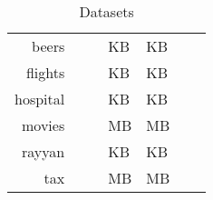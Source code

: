 \begin{table}[!t]
\caption{\label{tab:datasets_table}Datasets}
\centering
\begin{tabular}{r|K|K|K|K|H|K}
\toprule
 &  &  &   &   &  & \\
\midrule
beers    &    &  &   \textsc{KB} &   \textsc{KB} &   &  \\
flights  &    &   &   \textsc{KB} &   \textsc{KB} &   &  \\
hospital &    &  &   \textsc{KB} &   \textsc{KB} &  &  \\
movies   &    &  &  \textsc{MB} &  \textsc{MB} &  &  \\
rayyan   &    &  &   \textsc{KB} &   \textsc{KB} &   &  \\
tax      &  &  &  \textsc{MB} &  \textsc{MB} &  &  \\
\bottomrule    
\end{tabular}
\end{table}
